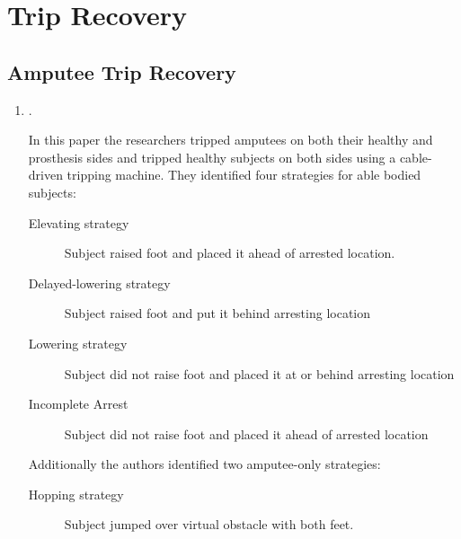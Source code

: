 \chapter{Trip Recovery} \label{ch:trip_recovery}

\section{Amputee Trip Recovery} \label{sec:amputee_trip_recovery}

\begin{enumerate} \item {}. 
    

    
    In this paper the researchers tripped amputees on both their healthy and
    prosthesis sides and tripped healthy subjects on both sides using a
    cable-driven tripping machine. They identified four strategies for able
    bodied subjects: 
    
    \begin{description} 
        \item[Elevating strategy] Subject raised foot and placed it ahead of
        arrested location.  

        \item[Delayed-lowering strategy] Subject raised foot and put it behind
        arresting location 

        \item[Lowering strategy] Subject did not raise foot and placed it at or
        behind arresting location 

        \item[Incomplete Arrest] Subject did not raise foot and placed it ahead
        of arrested location
    \end{description}
    
    Additionally the authors identified two amputee-only strategies:
    \begin{description} 
        \item[Hopping strategy] Subject jumped over virtual obstacle with both
        feet.  


\end{description}
\end{enumerate}
